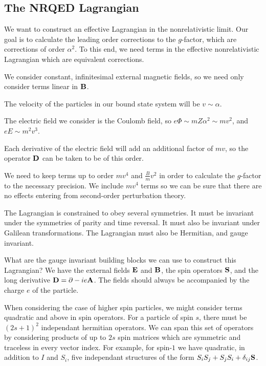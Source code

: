 \subsection{The NRQED Lagrangian}

We want to construct an effective Lagrangian in the nonrelativistic limit.  Our goal is to calculate the leading order corrections to the $g$-factor, which are corrections of order $\alpha^2$.  To this end, we need terms in the effective nonrelativistic Lagrangian which are equivalent corrections.


We consider constant, infinitesimal external magnetic fields, so we need only consider terms linear in $\mathbf{B}$.

The velocity of the particles in our bound state system will be $v \sim \alpha$.

The electric field we consider is the Coulomb field, so $e\Phi \sim m Z\alpha^2 \sim mv^2$, and $eE \sim m^2v^3$.

Each derivative of the electric field will add an additional factor of $mv$, so the operator $\mathbf{D}$ can be taken to be of this order.

We need to keep terms up to order $mv^4$ and $\frac{B}{m} v^2$ in order to calculate the $g$-factor to the necessary precision.  We include $mv^4$ terms so we can be sure that there are no effects entering from second-order perturbation theory.




The Lagrangian is constrained to obey several symmetries.  It must be invariant under the symmetries of parity and time reversal.  It must also be invariant under Galilean transformations.  The Lagrangian must also be Hermitian, and gauge invariant.

What are the gauge invariant building blocks we can use to construct this Lagrangian?  We have the external fields $\mathbf{E}$ and $\mathbf{B}$, the spin operators $\mathbf{S}$, and the long derivative $\mathbf{D} = \mathbf{\partial} - i e\mathbf{A}$.  The fields should always be accompanied by the charge $e$ of the particle.

When considering the case of higher spin particles, we might consider terms quadratic and above in spin operators.  For a particle of spin $s$, there must be $(2s+1)^2$ independant hermitian operators.  We can span this set of operators by considering products of up to $2s$ spin matrices which are symmetric and traceless in every vector index.  For example, for spin-$1$ we have quadratic, in addition to $I$ and $S_i$, five independant structures of the form $ S_i S_j + S_j S_i + \delta_{ij} \mathbf{S}$.


